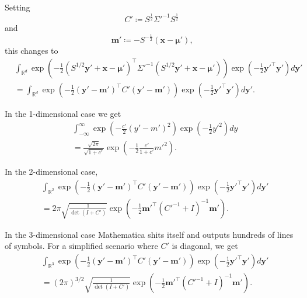 \documentclass[oneside, 11pt]{article}
\begin{document}
    Setting \[
        C' \coloneqq S^{\frac12}\Sigma'^{-1}S^{\frac12}
    \] and \[
        \mathbf{m'} \coloneqq -S^{-\frac12} (\mathbf{x} - \bm{\mu}') \text{,}
    \] this changes to \begin{align*}
        &\int_{\mathbb{R}^d} \exp\left(-\frac12 \left(S^{1/2} \mathbf{y}' + \mathbf{x} - \bm{\mu}'\right)^\top \Sigma'^{-1} \left(S^{1/2} \mathbf{y}' + \mathbf{x} - \bm{\mu}'\right) \right) \exp\left(-\frac12 \mathbf{y}'^\top \mathbf{y}' \right)  d\mathbf{y}' \\
        &= \int_{\mathbb{R}^d} \exp\left(-\frac12 \left(\mathbf{y}' - \mathbf{m}'\right)^\top C' \left(\mathbf{y}' - \mathbf{m}'\right) \right) \exp\left(-\frac12 \mathbf{y}'^\top \mathbf{y}' \right)  d\mathbf{y}' \text{.}
    \end{align*}

    In the 1-dimensional case we get \begin{align*}
        &\int_{-\infty}^{\infty} \exp\left(-\frac{c'}2 \left(y' - m'\right)^2 \right) \exp\left(-\frac12 y'^2 \right)  dy \\
        &= \frac{\sqrt{2\pi}}{\sqrt{1 + c'}} \exp\left(-\frac{1}{2}\frac{c'}{1+c'}m'^2 \right) \text{.}
    \end{align*}

    In the 2-dimensional case, \begin{align*}
        &\int_{\mathbb{R}^2} \exp\left(-\frac12 \left(\mathbf{y}' - \mathbf{m}'\right)^\top C' \left(\mathbf{y}' - \mathbf{m}'\right) \right) \exp\left(-\frac12 \mathbf{y}'^\top \mathbf{y}' \right)  d\mathbf{y}' \\
        &= 2 \pi \sqrt{\frac{1}{\det(I + C')}} \exp\left(-\frac{1}{2}\mathbf{m}'^\top \left(C'^{-1} + I\right)^{-1}\mathbf{m}'\right) \text{.}
    \end{align*}

    In the 3-dimensional case Mathematica shits itself and outputs hundreds of lines of symbols. For a simplified scenario where $C'$ is diagonal, we get\begin{align*}
        &\int_{\mathbb{R}^3} \exp\left(-\frac12 \left(\mathbf{y}' - \mathbf{m}'\right)^\top C' \left(\mathbf{y}' - \mathbf{m}'\right) \right) \exp\left(-\frac12 \mathbf{y}'^\top \mathbf{y}' \right)  d\mathbf{y}' \\
        &= (2 \pi)^{3/2} \sqrt{\frac{1}{\det(I + C')}} \exp\left(-\frac{1}{2}\mathbf{m}'^\top \left(C'^{-1} + I\right)^{-1}\mathbf{m}'\right) \text{.}
    \end{align*}
\end{document}
